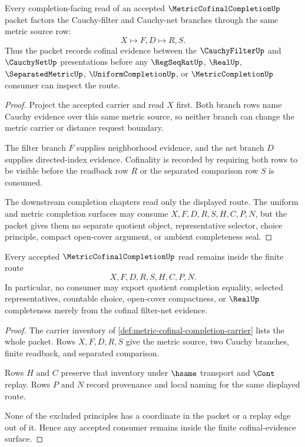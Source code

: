 \begin{theorem}
\label{thm:metric-cofinal-completion-filter-net-cofinality}
Every completion-facing read of an accepted $\MetricCofinalCompletionUp$ packet factors the Cauchy-filter and Cauchy-net branches through the same metric source row:
$$
X \longmapsto F,D \longmapsto R,S .
$$
Thus the packet records cofinal evidence between the $\CauchyFilterUp$ and $\CauchyNetUp$ presentations before any $\RegSeqRatUp$, $\RealUp$, $\SeparatedMetricUp$, $\UniformCompletionUp$, or $\MetricCompletionUp$ consumer can inspect the route.
\end{theorem}
\begin{proof}
Project the accepted carrier and read $X$ first. Both branch rows name Cauchy evidence over this same metric source, so neither branch can change the metric carrier or distance request boundary.

The filter branch $F$ supplies neighborhood evidence, and the net branch $D$ supplies directed-index evidence. Cofinality is recorded by requiring both rows to be visible before the readback row $R$ or the separated comparison row $S$ is consumed.

The downstream completion chapters read only the displayed route. The uniform and metric completion surfaces may consume $X,F,D,R,S,H,C,P,N$, but the packet gives them no separate quotient object, representative selector, choice principle, compact open-cover argument, or ambient completeness seal.
\end{proof}

\begin{theorem}
\label{thm:metric-cofinal-completion-nonescape}
Every accepted $\MetricCofinalCompletionUp$ read remains inside the finite route
$$
X,F,D,R,S,H,C,P,N .
$$
In particular, no consumer may export quotient completion equality, selected representatives, countable choice, open-cover compactness, or $\RealUp$ completeness merely from the cofinal filter-net evidence.
\end{theorem}
\begin{proof}
The carrier inventory of \autoref{def:metric-cofinal-completion-carrier} lists the whole packet. Rows $X,F,D,R,S$ give the metric source, two Cauchy branches, finite readback, and separated comparison.

Rows $H$ and $C$ preserve that inventory under $\hsame$ transport and $\Cont$ replay. Rows $P$ and $N$ record provenance and local naming for the same displayed route.

None of the excluded principles has a coordinate in the packet or a replay edge out of it. Hence any accepted consumer remains inside the finite cofinal-evidence surface.
\end{proof}


